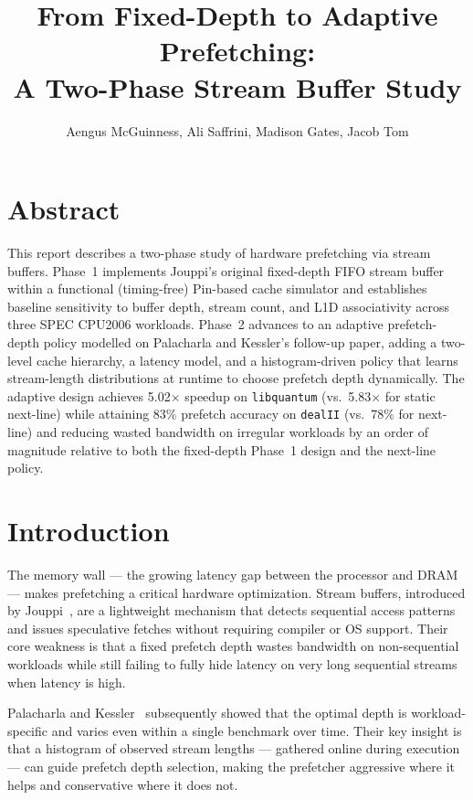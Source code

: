 \documentclass[11pt,letterpaper]{article}
\title{\textbf{From Fixed-Depth to Adaptive Prefetching:\\
A Two-Phase Stream Buffer Study}}
\author{Aengus McGuinness, Ali Saffrini, Madison Gates, Jacob Tom}
\date{}
\begin{document}
\maketitle

\section*{Abstract}

This report describes a two-phase study of hardware prefetching via stream
buffers. Phase~1 implements Jouppi's original fixed-depth FIFO stream buffer
within a functional (timing-free) Pin-based cache simulator and establishes
baseline sensitivity to buffer depth, stream count, and L1D associativity
across three SPEC CPU2006 workloads. Phase~2 advances to an adaptive
prefetch-depth policy modelled on Palacharla and Kessler's follow-up paper,
adding a two-level cache hierarchy, a latency model, and a histogram-driven
policy that learns stream-length distributions at runtime to choose prefetch
depth dynamically. The adaptive design achieves 5.02$\times$ speedup on
\texttt{libquantum} (vs.\ 5.83$\times$ for static next-line) while attaining
83\% prefetch accuracy on \texttt{dealII} (vs.\ 78\% for next-line) and
reducing wasted bandwidth on irregular workloads by an order of magnitude
relative to both the fixed-depth Phase~1 design and the next-line policy.

\section{Introduction}

The memory wall — the growing latency gap between the processor and DRAM —
makes prefetching a critical hardware optimization. Stream buffers, introduced
by Jouppi~\cite{jouppi1990improving}, are a lightweight mechanism that detects
sequential access patterns and issues speculative fetches without requiring
compiler or OS support. Their core weakness is that a fixed prefetch depth
wastes bandwidth on non-sequential workloads while still failing to fully
hide latency on very long sequential streams when latency is high.

Palacharla and Kessler~\cite{palacharla1994evaluating} subsequently showed
that the optimal depth is workload-specific and varies even within a single
benchmark over time. Their key insight is that a histogram of observed stream
lengths — gathered online during execution — can guide prefetch depth
selection, making the prefetcher aggressive where it helps and conservative
where it does not.
\end{document}
